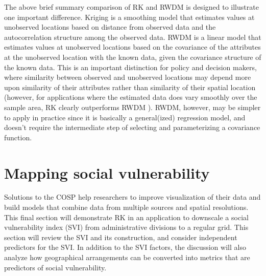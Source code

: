 \documentclass[draft]{article}
\begin{document}
The above brief summary comparison of RK and RWDM is designed to illustrate one important difference.  Kriging is a smoothing model that estimates values at unobserved locations based on distance from observed data and the autocorrelation structure among the observed data.  RWDM is a linear model that estimates values at unobserved locations based on the covariance of the attributes at the unobserved location with the known data, given the covariance structure of the known data.  This is an important distinction for policy and decision makers, where similarity between observed and unobserved locations may depend more upon similarity of their attributes rather than similarity of their spatial location (however, for applications where the estimated data does vary smoothly over the sample area, RK clearly outperforms RWDM \cite{bourennane00}).  RWDM, however, may be simpler to apply in practice since it is basically a general(ized) regression model, and doesn't require the intermediate step of selecting and parameterizing a covariance function.


\section{Mapping social vulnerability} %

Solutions to the COSP help researchers to improve visualization of their data and build models that combine data from multiple sources and spatial resolutions.  This final section will demonstrate RK in an application to downscale a social vulnerability index (SVI) from administrative divisions to a regular grid.  This section will review the SVI and its construction, and consider independent predictors for the SVI.  In addition to the SVI factors, the discussion will also analyze how geographical arrangements can be converted into metrics that are predictors of social vulnerability.
\end{document}
